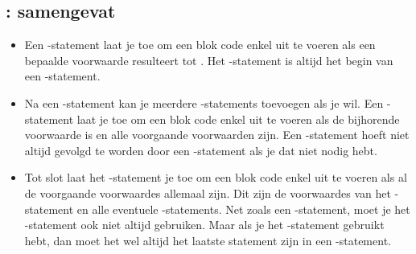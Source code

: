 \subsection{: samengevat}


\begin{itemize}
	\item
		\newline
		Een -statement laat je toe om een blok code enkel uit te voeren als een bepaalde voorwaarde resulteert tot \true.
		Het -statement is altijd het begin van een -statement.
	\item
		\newline
		Na een -statement kan je meerdere -statements toevoegen als je wil.
		Een -statement laat je toe om een blok code enkel uit te voeren als de bijhorende voorwaarde \true is
		en alle voorgaande voorwaarden \false zijn.
		Een -statement hoeft niet altijd gevolgd te worden door een -statement
		als je dat niet nodig hebt.
	\item
		\newline
		Tot slot laat het -statement je toe om een blok code enkel uit te voeren
		als al de voorgaande voorwaardes allemaal \false zijn.
		Dit zijn de voorwaardes van het -statement en alle eventuele -statements.
		Net zoals een -statement, moet je het -statement ook niet altijd gebruiken.
		Maar als je het -statement gebruikt hebt,
		dan moet het wel altijd het laatste statement zijn in een -statement.
\end{itemize}